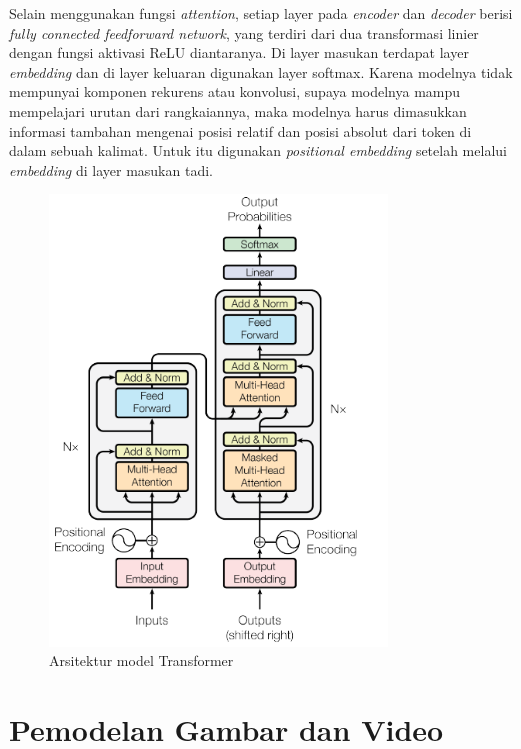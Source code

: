 Selain menggunakan fungsi \textit{attention}, setiap layer pada \textit{encoder} dan \textit{decoder} berisi \textit{fully connected feedforward network}, yang terdiri dari dua transformasi linier dengan fungsi aktivasi ReLU diantaranya. Di layer masukan terdapat layer \textit{embedding} dan di layer keluaran digunakan layer softmax. Karena modelnya tidak mempunyai komponen rekurens atau konvolusi, supaya modelnya mampu mempelajari urutan dari rangkaiannya, maka modelnya harus dimasukkan informasi tambahan mengenai posisi relatif dan posisi absolut dari token di dalam sebuah kalimat. Untuk itu digunakan \textit{positional embedding} setelah melalui \textit{embedding} di layer masukan tadi.

\begin{figure}[h]
    \centering
    \includegraphics[width=0.8\textwidth]{resources/images/arsitektur-transformer.png}
    \caption{Arsitektur model Transformer \parencite{Vaswani2017}}
    \label{fig:transformer}
\end{figure}


\section{Pemodelan Gambar dan Video}

